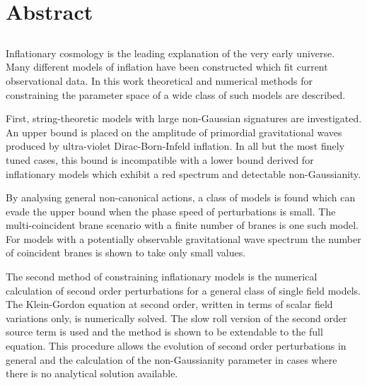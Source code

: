 % 

% 
% 
\chapter*{Abstract}
\label{ch:abstract}
\section*{}
\singlespacing
Inflationary cosmology is the leading explanation of the very early universe. 
Many different models of inflation have been constructed which fit current observational data.
In this work theoretical and numerical methods for constraining the parameter space of a wide class
of such models are described.

First, string-theoretic models with large non-Gaussian signatures are investigated.
An upper bound is placed on the amplitude of primordial gravitational waves produced by ultra-violet
Dirac-Born-Infeld inflation. In all but the most finely tuned cases, this bound is
incompatible with
a lower bound derived for inflationary models which exhibit a red spectrum and detectable
non-Gaussianity. 

By analysing general non-canonical actions, a class of models is found which can
evade the upper bound when the phase speed of perturbations is small. The multi-coincident brane
scenario with a finite number of branes is one such model. 
For models with a potentially observable gravitational wave spectrum the number of coincident branes
is shown to take only small values. 

The second method of constraining inflationary models is the numerical calculation
of second order perturbations for a general class of single field models.
The Klein-Gordon equation at second order, written in terms
of scalar field variations only, is numerically solved. 
The slow roll version of the second order source term is used and the method is
shown to be extendable to the full equation.
This procedure allows the evolution of second order
perturbations in general and the calculation of the non-Gaussianity parameter in
cases
where there is no analytical solution available.  


